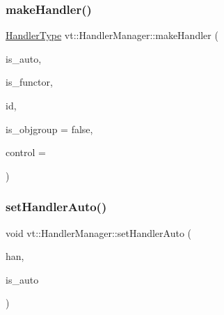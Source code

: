 \mbox{\label{structvt_1_1_handler_manager_afdcf47dc33bf1b88081e6cf19d033e7b}} 
\subsubsection{\texorpdfstring{make\+Handler()}{makeHandler()}}
{\footnotesize\ttfamily \hyperlink{namespacevt_af64846b57dfcaf104da3ef6967917573}{Handler\+Type} vt\+::\+Handler\+Manager\+::make\+Handler (\begin{DoxyParamCaption}\item[{bool}]{is\+\_\+auto,  }\item[{bool}]{is\+\_\+functor,  }\item[{\hyperlink{namespacevt_a59ae068fe828d1c33051ff96f3d016b6}{Handler\+Identifier\+Type}}]{id,  }\item[{bool}]{is\+\_\+objgroup = {\ttfamily false},  }\item[{\hyperlink{namespacevt_adbbef13b92f0a93b14c219b7cc8a48f2}{Handler\+Control\+Type}}]{control = {} }\end{DoxyParamCaption})\hspace{0.3cm}{\ttfamily [static]}}

\mbox{\label{structvt_1_1_handler_manager_a9100f9e0e946b58d98d104a5cbcf5574}} 
\subsubsection{\texorpdfstring{set\+Handler\+Auto()}{setHandlerAuto()}}
{\footnotesize\ttfamily void vt\+::\+Handler\+Manager\+::set\+Handler\+Auto (\begin{DoxyParamCaption}\item[{\hyperlink{namespacevt_af64846b57dfcaf104da3ef6967917573}{Handler\+Type} \&}]{han,  }\item[{bool}]{is\+\_\+auto }\end{DoxyParamCaption})\hspace{0.3cm}{\ttfamily [static]}}

\mbox{\label{structvt_1_1_handler_manager_a8cfa04599d2bd111f1197b7bf2343a05}} 
